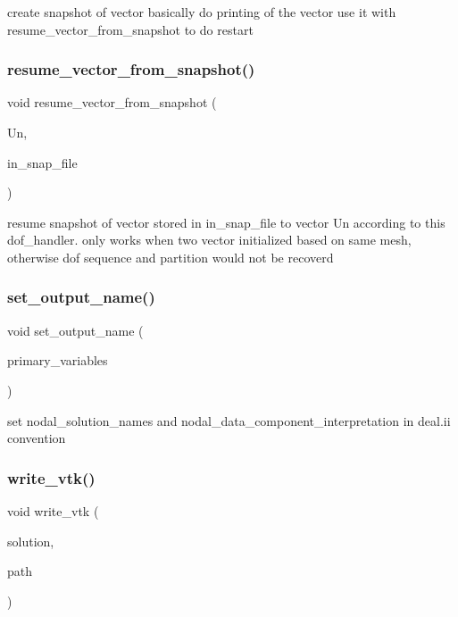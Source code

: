 create snapshot of vector basically do printing of the vector use it with resume\+\_\+vector\+\_\+from\+\_\+snapshot to do restart \mbox{\label{class_f_e_mdata_a2611613e158345b619062316e281c4c9}} 
\subsubsection{\texorpdfstring{resume\+\_\+vector\+\_\+from\+\_\+snapshot()}{resume\_vector\_from\_snapshot()}}
{\footnotesize\ttfamily void resume\+\_\+vector\+\_\+from\+\_\+snapshot (\begin{DoxyParamCaption}\item[{vector\+Type \&}]{Un,  }\item[{std\+::string}]{in\+\_\+snap\+\_\+file }\end{DoxyParamCaption})}

resume snapshot of vector stored in \textquotesingle{}in\+\_\+snap\+\_\+file\textquotesingle{} to vector \textquotesingle{}Un\textquotesingle{} according to this dof\+\_\+handler. only works when two vector initialized based on same mesh, otherwise dof sequence and partition would not be recoverd \mbox{\label{class_f_e_mdata_a770f8539c16d21624bcedc1f6bee9d68}} 
\subsubsection{\texorpdfstring{set\+\_\+output\+\_\+name()}{set\_output\_name()}}
{\footnotesize\ttfamily void set\+\_\+output\+\_\+name (\begin{DoxyParamCaption}\item[{std\+::vector$<$ std\+::vector$<$ std\+::string $>$ $>$}]{primary\+\_\+variables }\end{DoxyParamCaption})}

set nodal\+\_\+solution\+\_\+names and nodal\+\_\+data\+\_\+component\+\_\+interpretation in deal.\+ii convention \mbox{\label{class_f_e_mdata_a62d54e01135c4ab0b58f51441732dca3}} 
\subsubsection{\texorpdfstring{write\+\_\+vtk()}{write\_vtk()}}
{\footnotesize\ttfamily void write\+\_\+vtk (\begin{DoxyParamCaption}\item[{vector\+Type \&}]{solution,  }\item[{std\+::string}]{path }\end{DoxyParamCaption})}

